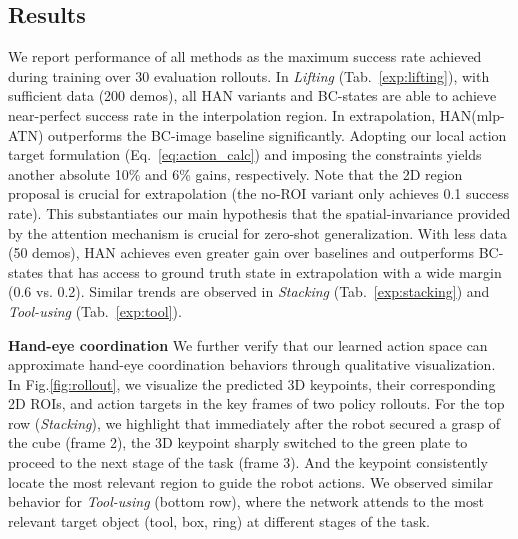 \documentclass[letterpaper, 10 pt, conference]{ieeeconf}
\newcommand{\algoName}{HAN\xspace}
\begin{document}
\subsection{Results}
We report performance of all methods as the maximum success rate achieved during training over 30 evaluation rollouts. In \emph{Lifting} (Tab.~\ref{exp:lifting}), with sufficient data (200 demos), all \algoName variants and BC-states are able to achieve near-perfect success rate in the interpolation region. In extrapolation, \algoName (mlp-ATN) outperforms the BC-image baseline significantly. Adopting our local action target formulation (Eq.~\eqref{eq:action_calc}) and imposing the constraints yields another absolute 10\% and 6\% gains, respectively. Note that the 2D region proposal is crucial for extrapolation (the no-ROI variant only achieves 0.1 success rate). This substantiates our main hypothesis that the spatial-invariance provided by the attention mechanism is crucial for zero-shot generalization. With less data (50 demos), \algoName achieves even greater gain over baselines and outperforms BC-states that has access to ground truth state in extrapolation with a wide margin (0.6 vs. 0.2). Similar trends are observed in \emph{Stacking} (Tab.~\ref{exp:stacking}) and \emph{Tool-using} (Tab.~\ref{exp:tool}).

\textbf{Hand-eye coordination} We further verify that our learned action space can approximate hand-eye coordination behaviors through qualitative visualization. In Fig.\ref{fig:rollout}, we visualize the predicted 3D keypoints, their corresponding 2D ROIs, and action targets in the key frames of two policy rollouts. For the top row (\emph{Stacking}), we highlight that immediately after the robot secured a grasp of the cube (frame 2), the 3D keypoint sharply switched to the green plate to proceed to the next stage of the task (frame 3). And the keypoint consistently locate the most relevant region to guide the robot actions. We observed similar behavior for \emph{Tool-using} (bottom row), where the network attends to the most relevant target object (tool, box, ring) at different stages of the task.
\end{document}
